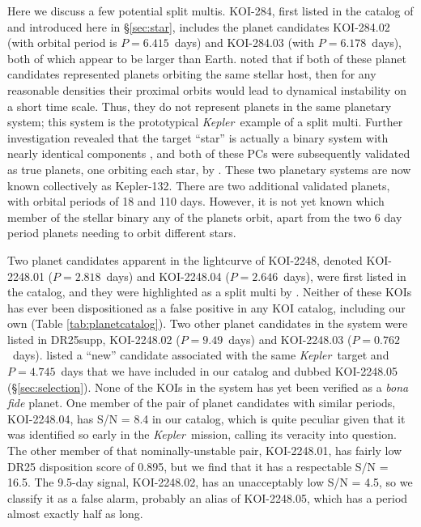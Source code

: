 \documentclass{aastex62}
\newcommand{\ik}{{\it Kepler~}}
\begin{document}
Here we discuss a few potential split multis.  
KOI-284, first listed in the catalog of \cite{Borucki:2011b} and introduced here in \S\ref{sec:star}, includes the planet candidates KOI-284.02 (with orbital period is $P = 6.415$~days) and KOI-284.03 (with $P = 6.178$~days), both of which appear to be larger than Earth.  \cite{Lissauer:2011b} noted that if both of these planet candidates represented planets orbiting the same stellar host, then for any reasonable densities their proximal orbits would lead to dynamical instability on a short time scale. Thus, they do not represent planets in the same planetary system; this system is the prototypical \ik example of a split multi. Further investigation revealed that the target ``star'' is actually a binary system with nearly identical components \citep{Lissauer:2012}, and both of these PCs were subsequently validated as true planets, one orbiting each star, by \cite{Lissauer:2014}.  These two planetary systems are now known collectively as Kepler-132. There are two additional validated planets, with orbital periods of 18 and 110 days.  However, it is not yet known which member of the stellar binary any of the planets orbit, apart from the two 6 day period planets needing to orbit different stars.

Two planet candidates apparent in the lightcurve of KOI-2248, denoted KOI-2248.01 ($P = 2.818$~days) and KOI-2248.04 ($P = 2.646$~days), were first listed in the \cite{Batalha:2013} catalog, and they were highlighted as a split multi by \cite{Fabrycky:2014}. Neither of these KOIs has ever been dispositioned as a false positive in any KOI catalog, including our own (Table \ref{tab:planetcatalog}). Two other planet candidates in the system were listed in DR25supp, KOI-2248.02 ($P = 9.49$~days) and KOI-2248.03 ($P = 0.762$~days). \cite{Shallue:2018} listed a ``new'' candidate associated with the same \ik target and $P = 4.745$~days that we have included in our catalog and dubbed KOI-2248.05 (\S\ref{sec:selection}).  None of the KOIs in the system has yet been verified as a {\it bona fide} planet. One member of the pair of planet candidates with similar periods, KOI-2248.04, has S/N = 8.4 in our catalog, which is quite peculiar given that it was identified so early in the \ik mission, calling its veracity into question.  The other member of that nominally-unstable pair, KOI-2248.01, has fairly low DR25 disposition score of 0.895, but we find that it has a respectable S/N = 16.5.  The 9.5-day signal, KOI-2248.02, has an unacceptably low S/N = 4.5, so we classify it as a false alarm, probably an alias of KOI-2248.05, which has a period almost exactly half as long.
\end{document}
